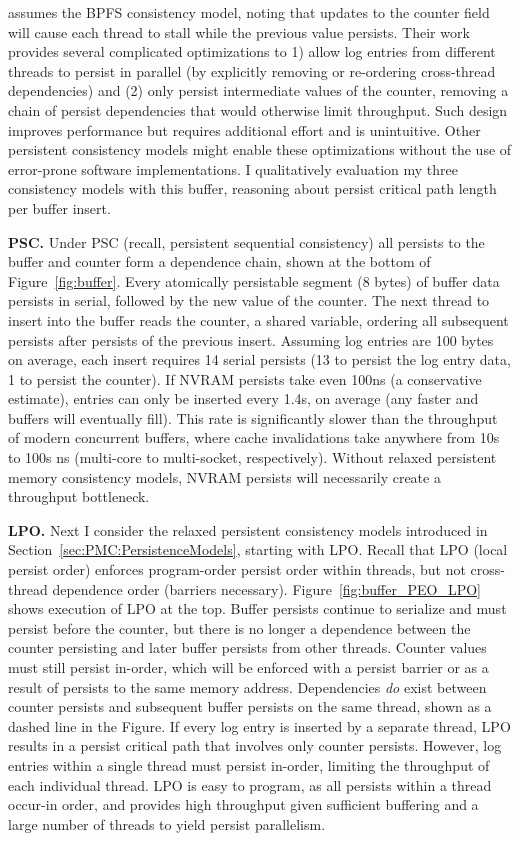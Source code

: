 \cite{FangHsiao11} assumes the BPFS consistency model, noting that updates to the counter field will cause each thread to stall while the previous value persists.
Their work provides several complicated optimizations to 1) allow log entries from different threads to persist in parallel (by explicitly removing or re-ordering cross-thread dependencies) and (2) only persist intermediate values of the counter, removing a chain of persist dependencies that would otherwise limit throughput.
Such design improves performance but requires additional effort and is unintuitive.
Other persistent consistency models might enable these optimizations without the use of error-prone software implementations.
I qualitatively evaluation my three consistency models with this buffer, reasoning about persist critical path length per buffer insert.

\textbf{PSC.} Under PSC (recall, persistent sequential consistency) all persists to the buffer and counter form a dependence chain, shown at the bottom of Figure~\ref{fig:buffer}.
Every atomically persistable segment (8 bytes) of buffer data persists in serial, followed by the new value of the counter.
The next thread to insert into the buffer reads the counter, a shared variable, ordering all subsequent persists after persists of the previous insert.
Assuming log entries are 100 bytes on average, each insert requires 14 serial persists (13 to persist the log entry data, 1 to persist the counter).
If NVRAM persists take even 100ns (a conservative estimate), entries can only be inserted every 1.4\textmu s, on average (any faster and buffers will eventually fill).
This rate is significantly slower than the throughput of modern concurrent buffers, where cache invalidations take anywhere from 10s to 100s ns (multi-core to multi-socket, respectively).
Without relaxed persistent memory consistency models, NVRAM persists will necessarily create a throughput bottleneck.



\textbf{LPO.} Next I consider the relaxed persistent consistency models introduced in Section~\ref{sec:PMC:PersistenceModels}, starting with LPO.
Recall that LPO (local persist order) enforces program-order persist order within threads, but not cross-thread dependence order (barriers necessary).
Figure~\ref{fig:buffer_PEO_LPO} shows execution of LPO at the top.
Buffer persists continue to serialize and must persist before the counter, but there is no longer a dependence between the counter persisting and later buffer persists from other threads.
Counter values must still persist in-order, which will be enforced with a persist barrier or as a result of persists to the same memory address.
Dependencies \emph{do} exist between counter persists and subsequent buffer persists on the same thread, shown as a dashed line in the Figure.
If every log entry is inserted by a separate thread, LPO results in a persist critical path that involves only counter persists.
However, log entries within a single thread must persist in-order, limiting the throughput of each individual thread.
LPO is easy to program, as all persists within a thread occur-in order, and provides high throughput given sufficient buffering and a large number of threads to yield persist parallelism.

